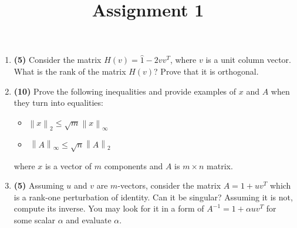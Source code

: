 \documentclass[prb,papersize=a4paper,notitlepage]{revtex4-2}%
\newcommand{\norm}[1]{\left\lVert#1\right\rVert}
\begin{document}
\title{Assignment 1}

\maketitle

\begin{enumerate}

\item \textbf{(5)} Consider the matrix $H(v)=\hat 1 - 2 v v^T$, where $v$ is a unit column vector. What is the rank of the matrix $H(v)$? Prove that it is orthogonal.




\item \textbf{(10)} Prove the following inequalities and provide examples of $x$ and $A$ when they turn into equalities:
\begin{itemize}
\item $\norm{x}_2 \le \sqrt{m}\norm{x}_\infty$
\item $\
\norm{A}_\infty \le \sqrt{n} \norm{A}_2$
\end{itemize}
where $x$ is a vector of $m$ components and $A$ is $m\times n$ matrix.

\item \textbf{(5)} Assuming $u$ and $v$ are $m$-vectors, consider the matrix $A=1+u v^T$ which is a rank-one perturbation of identity. Can it be singular? Assuming it is not, compute its inverse. You may look for it in a form of $A^{-1}=1+\alpha u v^T$ for some scalar $\alpha$ and evaluate $\alpha$.


\end{enumerate}
\end{document}
